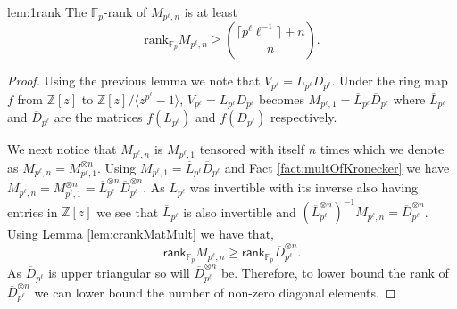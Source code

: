 \documentclass[11pt]{article}
\numberwithin{equation}{section}
\def\F{{\mathbb{F}}}
\def\Z{{\mathbb{Z}}}
\def\rank{\textsf{rank}}
\begin{document}
\begin{replem}{lem:1rank}
The $\F_p$-rank of $M_{p^\ell,n}$ is at least 
{\em $$\text{rank}_{\F_p} M_{p^\ell,n} \ge \binom{\lceil p^\ell \ell^{-1}\rceil +n}{n}.$$}
\end{replem}

\begin{proof}
Using the previous lemma we note that $V_{p^\ell}=L_{p^\ell}D_{p^\ell}$. Under the ring map $f$ from $\Z[z]$ to $\Z[z]/\langle z^{p^\ell}-1\rangle$, $V_{p^\ell}=L_{p^\ell}D_{p^\ell}$ becomes $M_{p^\ell,1}=\overline{L}_{p^\ell}\overline{D}_{p^\ell}$ where $\overline{L}_{p^\ell}$ and $\overline{D}_{p^\ell}$ are the matrices $f(L_{p^\ell})$ and $f(D_{p^\ell})$ respectively.

We next notice that $M_{p^\ell,n}$ is $M_{p^\ell,1}$ tensored with itself $n$ times which we denote as $M_{p^\ell,n}=M_{p^\ell,1}^{\otimes n}$. Using $M_{p^\ell,1}=\overline{L}_{p^\ell}\overline{D}_{p^\ell}$ and Fact \ref{fact:multOfKronecker} we have $M_{p^\ell,n}=M_{p^\ell,1}^{\otimes n}=\overline{L}_{p^\ell}^{\otimes n}\overline{D}_{p^\ell}^{\otimes n}$. As $L_{p^\ell}$ was invertible with its inverse also having entries in $\Z[z]$ we see that $\overline{L}_{p^\ell}$ is also invertible and $\left(\overline{L}_{p^\ell}^{\otimes n}\right)^{-1}M_{p^\ell,n}= \overline{D}_{p^\ell}^{\otimes n}$. Using Lemma \ref{lem:crankMatMult} we have that,
$$\rank_{\F_p} M_{p^\ell,n}\ge \rank_{\F_p} \overline{D}_{p^\ell}^{\otimes n}.$$
As $\overline{D}_{p^\ell}$ is upper triangular so will $\overline{D}_{p^\ell}^{\otimes n}$ be. Therefore, to lower bound the rank of $\overline{D}_{p^\ell}^{\otimes n}$ we can lower bound the number of non-zero diagonal elements. 


\end{proof}
\end{document}
